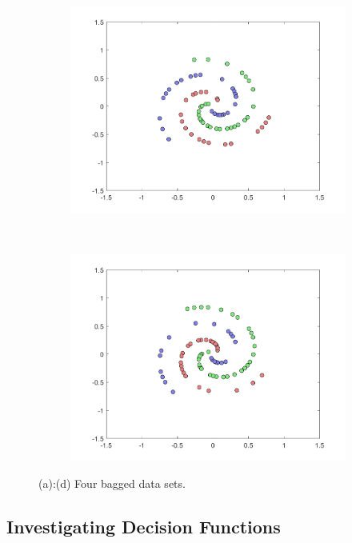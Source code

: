 \documentclass[a4paper, 10pt, conference]{ieeeconf}
\begin{document}
\begin{figure}[!ht]
\begin{subfigure}{0.45\linewidth}
      \includegraphics[width=\textwidth]{img/bagged_3}
      \caption{}
    \end{subfigure}
    ~
    \begin{subfigure}{0.45\linewidth}
      \includegraphics[width=\textwidth]{img/bagged_4}
      \caption{}
      \label{fig:used_bagged}
    \end{subfigure}

	\caption{(a):(d) Four bagged data sets.}
    \label{fig:bagged_data}
\end{figure}

\subsection{Investigating Decision Functions}
\end{document}
